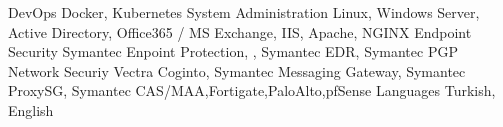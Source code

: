 

\begin{cvskills}

  \cvskill
    {DevOps} %
    {Docker, Kubernetes} %
  \cvskill
    {System Administration} %
    {Linux, Windows Server, Active Directory, Office365 / MS Exchange, IIS, Apache, NGINX} %
  \cvskill
    {Endpoint Security} %
    {Symantec Enpoint Protection, , Symantec EDR, Symantec PGP} %
  \cvskill
    {Network Securiy} %
    {Vectra Coginto, Symantec Messaging Gateway, Symantec ProxySG, Symantec CAS/MAA,Fortigate,PaloAlto,pfSense } %
  \cvskill
    {Languages} %
    {Turkish, English} %
\end{cvskills}
